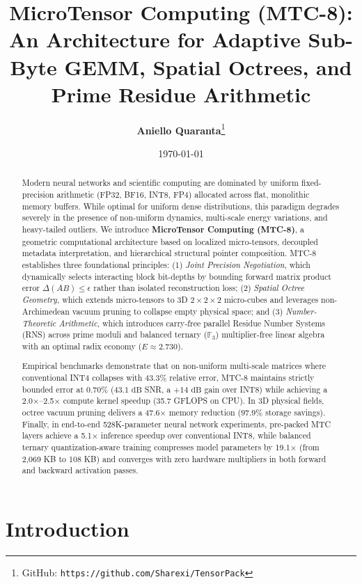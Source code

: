 \documentclass[11pt,a4paper]{article}
\title{\textbf{MicroTensor Computing (MTC-8):\\An Architecture for Adaptive Sub-Byte GEMM, Spatial Octrees, and Prime Residue Arithmetic}}
\author{\textbf{Aniello Quaranta}\thanks{GitHub: \texttt{https://github.com/Sharexi/TensorPack}}}
\date{\today}
\begin{document}
\maketitle

\begin{abstract}
Modern neural networks and scientific computing are dominated by uniform fixed-precision arithmetic (FP32, BF16, INT8, FP4) allocated across flat, monolithic memory buffers. While optimal for uniform dense distributions, this paradigm degrades severely in the presence of non-uniform dynamics, multi-scale energy variations, and heavy-tailed outliers. We introduce \textbf{MicroTensor Computing (MTC-8)}, a geometric computational architecture based on localized micro-tensors, decoupled metadata interpretation, and hierarchical structural pointer composition. MTC-8 establishes three foundational principles: (1) \emph{Joint Precision Negotiation}, which dynamically selects interacting block bit-depths by bounding forward matrix product error $\Delta(AB) \le \epsilon$ rather than isolated reconstruction loss; (2) \emph{Spatial Octree Geometry}, which extends micro-tensors to 3D $2\times 2\times 2$ micro-cubes and leverages non-Archimedean vacuum pruning to collapse empty physical space; and (3) \emph{Number-Theoretic Arithmetic}, which introduces carry-free parallel Residue Number Systems (RNS) across prime moduli and balanced ternary ($\mathbb{F}_3$) multiplier-free linear algebra with an optimal radix economy ($E \approx 2.730$). 

Empirical benchmarks demonstrate that on non-uniform multi-scale matrices where conventional INT4 collapses with 43.3\% relative error, MTC-8 maintains strictly bounded error at 0.70\% ($43.1\text{ dB}$ SNR, a $+14\text{ dB}$ gain over INT8) while achieving a 2.0$\times$--2.5$\times$ compute kernel speedup (35.7 GFLOPS on CPU). In 3D physical fields, octree vacuum pruning delivers a 47.6$\times$ memory reduction (97.9\% storage savings). Finally, in end-to-end 528K-parameter neural network experiments, pre-packed MTC layers achieve a 5.1$\times$ inference speedup over conventional INT8, while balanced ternary quantization-aware training compresses model parameters by 19.1$\times$ (from 2,069 KB to 108 KB) and converges with zero hardware multipliers in both forward and backward activation passes.
\end{abstract}

\section{Introduction}
\end{document}
